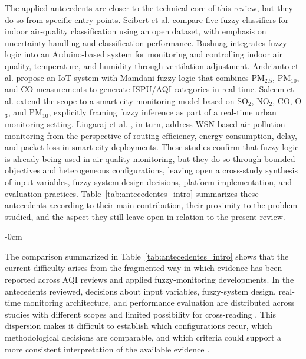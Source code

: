 The applied antecedents are closer to the technical core of this review, but they do so from specific entry points. Seibert et al. \cite{ART04} compare five fuzzy classifiers for indoor air-quality classification using an open dataset, with emphasis on uncertainty handling and classification performance. Bushnag \cite{ART05} integrates fuzzy logic into an Arduino-based system for monitoring and controlling indoor air quality, temperature, and humidity through ventilation adjustment. Andrianto et al. \cite{ART06} propose an IoT system with Mamdani fuzzy logic that combines PM$_{2.5}$, PM$_{10}$, and CO measurements to generate ISPU/AQI categories in real time. Saleem et al. \cite{ART07} extend the scope to a smart-city monitoring model based on SO$_2$, NO$_2$, CO, O$_3$, and PM$_{10}$, explicitly framing fuzzy inference as part of a real-time urban monitoring setting. Lingaraj et al. \cite{ART08}, in turn, address WSN-based air pollution monitoring from the perspective of routing efficiency, energy consumption, delay, and packet loss in smart-city deployments. These studies confirm that fuzzy logic is already being used in air-quality monitoring, but they do so through bounded objectives and heterogeneous configurations, leaving open a cross-study synthesis of input variables, fuzzy-system design decisions, platform implementation, and evaluation practices. Table~\ref{tab:antecedentes_intro} summarizes these antecedents according to their main contribution, their proximity to the problem studied, and the aspect they still leave open in relation to the present review.

\begin{adjustwidth}{-\extralength}{0cm}

\end{adjustwidth}
The comparison summarized in Table~\ref{tab:antecedentes_intro} shows that the current difficulty arises from the fragmented way in which evidence has been reported across AQI reviews and applied fuzzy-monitoring developments. In the antecedents reviewed, decisions about input variables, fuzzy-system design, real-time monitoring architecture, and performance evaluation are distributed across studies with different scopes and limited possibility for cross-reading \cite{ART01,ART02,PROB08,ART04,ART05,ART06,ART07,ART08}. This dispersion makes it difficult to establish which configurations recur, which methodological decisions are comparable, and which criteria could support a more consistent interpretation of the available evidence \cite{ART01,ART02,ART04,ART05,ART06,ART07,ART08}.

